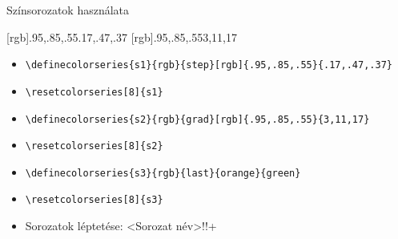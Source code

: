 \documentclass[aspectratio=1610, dvipsnames, xcolor=table]{beamer}
\begin{document}
    \begin{frame}[fragile]{Színsorozatok használata}
        
        [rgb]{.95,.85,.55}{.17,.47,.37}
        [rgb]{.95,.85,.55}{3,11,17}
            \begin{itemize}
                \item {} \verb!\definecolorseries{s1}{rgb}{step}[rgb]{.95,.85,.55}{.17,.47,.37}!
                \item {} \verb!\resetcolorseries[8]{s1}!
                \item {} \verb!\definecolorseries{s2}{rgb}{grad}[rgb]{.95,.85,.55}{3,11,17}!
                \item {} \verb!\resetcolorseries[8]{s2}!
                \item {} \verb!\definecolorseries{s3}{rgb}{last}{orange}{green}!
                \item {} \verb!\resetcolorseries[8]{s3}!
                \item Sorozatok léptetése: <Sorozat név>!!+
            \end{itemize}            
    \end{frame}
\end{document}
